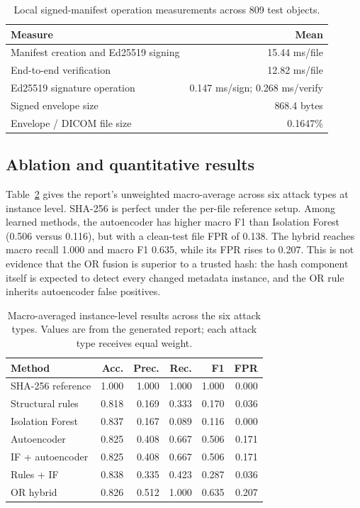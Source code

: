 \documentclass[journal]{IEEEtran}
\begin{document}
  \begin{table}[t]
  \caption{Local signed-manifest operation measurements across 809 test objects.}
  \label{tab:security_timing}
  \centering\footnotesize
  \begin{tabular}{lr}
  \toprule
  Measure & Mean \\
  \midrule
  Manifest creation and Ed25519 signing & 15.44 ms/file \\
  End-to-end verification & 12.82 ms/file \\
  Ed25519 signature operation & 0.147 ms/sign; 0.268 ms/verify \\
  Signed envelope size & 868.4 bytes \\
  Envelope / DICOM file size & 0.1647\% \\
  \bottomrule
  \end{tabular}
  \end{table}
  
  \subsection{Ablation and quantitative results}
  Table~\ref{tab:macro} gives the report's unweighted macro-average across six attack types at instance level. SHA-256 is perfect under the per-file reference setup. Among learned methods, the autoencoder has higher macro F1 than Isolation Forest (0.506 versus 0.116), but with a clean-test file FPR of 0.138. The hybrid reaches macro recall 1.000 and macro F1 0.635, while its FPR rises to 0.207. This is not evidence that the OR fusion is superior to a trusted hash: the hash component itself is expected to detect every changed metadata instance, and the OR rule inherits autoencoder false positives.
  
  \begin{table}[t]
  \caption{Macro-averaged instance-level results across the six attack types. Values are from the generated report; each attack type receives equal weight.}
  \label{tab:macro}
  \centering\footnotesize
  \begin{tabular}{lrrrrr}
  \toprule
  Method & Acc. & Prec. & Rec. & F1 & FPR \\
  \midrule
  SHA-256 reference & 1.000 & 1.000 & 1.000 & 1.000 & 0.000 \\
  Structural rules & 0.818 & 0.169 & 0.333 & 0.170 & 0.036 \\
  Isolation Forest & 0.837 & 0.167 & 0.089 & 0.116 & 0.000 \\
  Autoencoder & 0.825 & 0.408 & 0.667 & 0.506 & 0.171 \\
  IF + autoencoder & 0.825 & 0.408 & 0.667 & 0.506 & 0.171 \\
  Rules + IF & 0.838 & 0.335 & 0.423 & 0.287 & 0.036 \\
  OR hybrid & 0.826 & 0.512 & 1.000 & 0.635 & 0.207 \\
  \bottomrule
  \end{tabular}
  \end{table}
  
\end{document}
